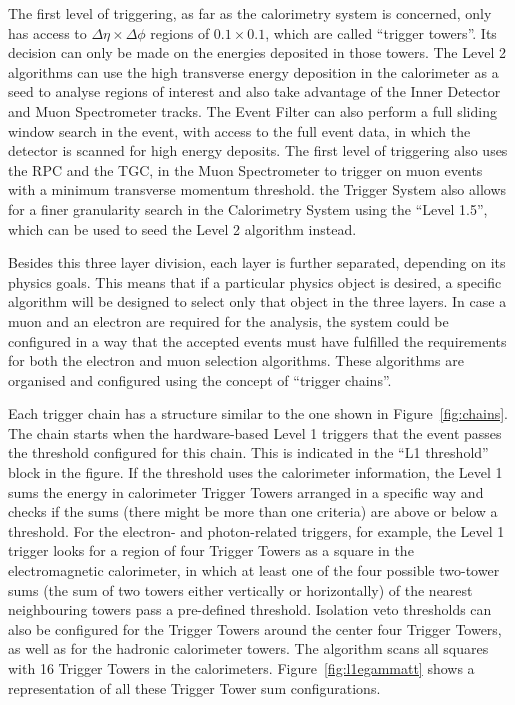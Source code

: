 The first level of triggering, as far as the calorimetry system is concerned, only has access
to $\Delta \eta \times \Delta \phi$ regions of $0.1 \times 0.1$, which are called ``trigger towers''. Its decision can only
be made on the energies deposited in those towers. The Level 2 algorithms can use the high transverse energy deposition in the
calorimeter as a seed to analyse regions of interest and also take advantage of the Inner Detector and Muon Spectrometer tracks. The Event Filter
can also perform a full sliding window search in the event, with access to the full event data, in which the detector is scanned for high energy
deposits.
The first level of triggering also uses the RPC and the TGC, in the Muon Spectrometer to trigger on muon events with a minimum
transverse momentum threshold.
the Trigger System also allows for a finer granularity search in the Calorimetry System using the ``Level 1.5'', which can be used to seed the Level 2 algorithm instead.

Besides this three layer division, each layer is further separated, depending on its physics goals.
This means that if a particular physics object is desired,
a specific algorithm will be designed to select only that object in the three layers.
In case a muon and an electron are required for the analysis, the system could be configured in a way
that the accepted events must have fulfilled the requirements for both the electron
and muon selection algorithms. These algorithms are organised and configured using the concept of ``trigger chains''.

Each trigger chain has a structure similar to the one shown in Figure~\ref{fig:chains}. The chain starts when the hardware-based Level 1
triggers that the event passes the threshold configured for this chain. This is indicated in the ``L1 threshold'' block in the figure.
If the threshold uses the calorimeter information, the Level 1 sums the energy in calorimeter
Trigger Towers arranged in a specific way and checks if the sums (there might be more than one criteria) are above or below a threshold.
For the electron- and photon-related triggers, for example, the Level 1 trigger looks for a
region of four Trigger Towers as a square in the electromagnetic calorimeter,
in which at least one of the four possible two-tower sums (the sum of two towers either vertically or horizontally) of the nearest neighbouring towers pass a
pre-defined threshold. Isolation veto thresholds can also be configured for the Trigger Towers around the center four Trigger Towers, as well as for the hadronic calorimeter
towers. The algorithm scans all squares with 16 Trigger Towers in the calorimeters.
Figure~\ref{fig:l1egammatt} shows a representation of all these Trigger Tower sum configurations.

